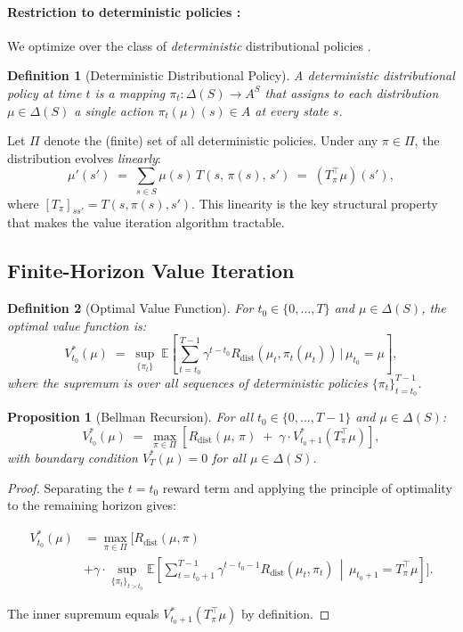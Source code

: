 \documentclass{article}
\newtheorem{proposition}[theorem]{Proposition}
\newtheorem{definition}{Definition}
\begin{document}
\paragraph{Restriction to deterministic policies : } We optimize over the class of 
\emph{deterministic} distributional policies .




\begin{definition}[Deterministic Distributional Policy]
A \emph{deterministic distributional policy} at time $t$ is a mapping 
$\pi_t : \Delta(S) \to A^{S}$ that assigns to each distribution 
$\mu \in \Delta(S)$ a single action $\pi_t(\mu)(s) \in A$ at every state $s$.
\end{definition}

Let $\Pi$ denote the (finite) set of all deterministic policies. Under any 
$\pi \in \Pi$, the distribution evolves \emph{linearly}:
\[
    \mu'(s') \;=\; \sum_{s \in S} \mu(s)\,T(s,\,\pi(s),\,s') 
              \;=\; (T_\pi^\top \mu)(s'),
\]
where $[T_\pi]_{ss'} = T(s,\pi(s),s')$. This linearity is the key 
structural property that makes the value iteration algorithm tractable.

\subsection{Finite-Horizon Value Iteration}

\begin{definition}[Optimal Value Function]
For $t_0 \in \{0,\ldots,T\}$ and $\mu \in \Delta(S)$, the 
\emph{optimal value function} is:
\[
    V_{t_0}^*(\mu) 
    \;=\; \sup_{\{\pi_t\}} \;\mathbb{E}\!\left[
        \sum_{t=t_0}^{T-1} \gamma^{t-t_0} R_{\mathrm{dist}}(\mu_t, \pi_t(\mu_t))
        \,\Big|\, \mu_{t_0} = \mu
    \right],
\]
where the supremum is over all sequences of deterministic policies 
$\{\pi_t\}_{t=t_0}^{T-1}$.
\end{definition}

\begin{proposition}[Bellman Recursion]\label{prop:bellman-finite}
For all $t_0 \in \{0,\ldots,T-1\}$ and $\mu \in \Delta(S)$:
\[
    V_{t_0}^*(\mu) 
    \;=\; \max_{\pi \in \Pi} \left[ 
        R_{\mathrm{dist}}(\mu,\,\pi) \;+\; \gamma\cdot V_{t_0+1}^*(T_\pi^\top \mu)
    \right],
\]
with boundary condition $V_T^*(\mu) = 0$ for all $\mu \in \Delta(S)$.
\end{proposition}

\begin{proof}
Separating the $t = t_0$ reward term and applying the principle of 
optimality to the remaining horizon gives:

\begin{align}
V_{t_0}^*(\mu) 
&= \max_{\pi \in \Pi}\!\Bigg[
    R_{\mathrm{dist}}(\mu,\pi) \\
& + \gamma \cdot \sup_{\{\pi_t\}_{t>t_0}}
    \mathbb{E}\!\left[
        \sum_{t=t_0+1}^{T-1}\!\gamma^{t-t_0-1}
        R_{\mathrm{dist}}(\mu_t,\pi_t)
        \,\middle|\,
        \mu_{t_0+1} = T_\pi^\top\mu
    \right]
\Bigg].
\end{align}


The inner supremum equals $V_{t_0+1}^*(T_\pi^\top\mu)$ by definition.
\end{proof}
\end{document}
